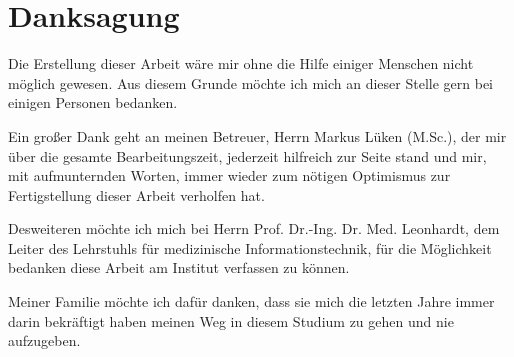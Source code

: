 \chapter{Danksagung}
Die Erstellung dieser Arbeit wäre mir ohne die Hilfe einiger Menschen nicht möglich gewesen.
Aus diesem Grunde möchte ich mich an dieser Stelle gern bei einigen Personen bedanken.

Ein großer Dank geht an meinen Betreuer, Herrn Markus Lüken (M.Sc.), der mir über die gesamte Bearbeitungszeit, jederzeit hilfreich zur Seite stand und mir, mit aufmunternden Worten, immer wieder zum nötigen Optimismus zur Fertigstellung dieser Arbeit verholfen hat.

Desweiteren möchte ich mich bei Herrn Prof. Dr.-Ing. Dr. Med. Leonhardt, dem Leiter des Lehrstuhls für medizinische Informationstechnik, für die Möglichkeit bedanken diese Arbeit am Institut verfassen zu können.

Meiner Familie möchte ich dafür danken, dass sie mich die letzten Jahre immer darin bekräftigt haben meinen Weg in diesem Studium zu gehen und nie aufzugeben.
